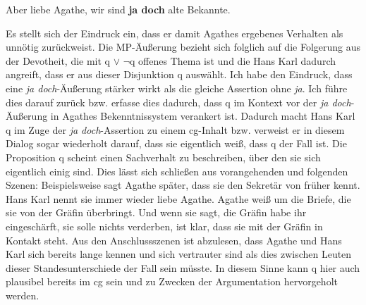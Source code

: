 \begin{exe}
	\ex\label{453} 
	Aber liebe Agathe, wir sind \textbf{ja doch} alte Bekannte.
\end{exe}
Es stellt sich der Eindruck ein, dass er damit Agathes ergebenes Verhalten als unnötig zurückweist. Die MP-Äußerung bezieht sich folglich auf die Folgerung aus der Devotheit, die mit q $\vee$ $\neg$q offenes Thema ist und die Hans Karl dadurch angreift, dass er aus dieser Disjunktion q auswählt. Ich habe den Eindruck, dass eine \textit{ja doch}-Äußerung stärker wirkt als die gleiche Assertion ohne \textit{ja}. Ich führe dies darauf zurück bzw. erfasse dies dadurch, dass q im Kontext vor der \textit{ja doch}-Äußerung in Agathes Bekenntnissystem verankert ist. Dadurch macht Hans Karl q im Zuge der \textit{ja doch}-Assertion zu einem cg-Inhalt bzw. verweist er in diesem Dialog sogar wiederholt darauf, dass sie eigentlich weiß, dass q der Fall ist. Die Proposition q scheint einen Sachverhalt zu beschreiben, über den sie sich eigentlich einig sind. Dies lässt sich schließen aus vorangehenden und folgenden Szenen: Beispielsweise sagt Agathe später, dass sie den Sekretär von früher kennt. Hans Karl nennt sie immer wieder \glqq liebe Agathe\grqq{}. Agathe weiß um die Briefe, die sie von der Gräfin überbringt. Und wenn sie sagt, die Gräfin habe ihr eingeschärft, sie solle nichts verderben, ist klar, dass sie mit der Gräfin in Kontakt steht. Aus den Anschlussszenen ist abzulesen, dass Agathe und Hans Karl sich bereits lange kennen und sich vertrauter sind als dies zwischen Leuten dieser Standesunterschiede der Fall sein müsste. In diesem Sinne kann q hier auch plausibel bereits im cg sein und zu Zwecken der Argumentation hervorgeholt werden.


